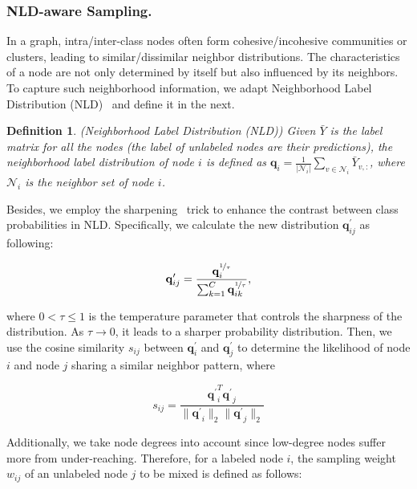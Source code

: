 \documentclass[letterpaper]{article} %
\newtheorem{definition}{Definition}
\newcommand{\aVec}[1]{\mathbf{#1}}
\begin{document}
\subsubsection{NLD-aware Sampling.}
In a graph, intra/inter-class nodes often form cohesive/incohesive communities or clusters, leading to similar/dissimilar neighbor distributions. The characteristics of a node are not only determined by itself but also influenced by its neighbors. To capture such neighborhood information, we adapt Neighborhood Label Distribution (NLD)~\cite{NLD} and define it in the next.
\begin{definition}{(Neighborhood Label Distribution (NLD))}
	 Given $\bar{Y}$ is the label matrix for all the nodes (the label of unlabeled nodes are their predictions), the neighborhood label distribution of node $i$ is defined as $\aVec{q}_{i} = \frac{1}{|\mathcal{N}_{i}|} \sum_{v \in \mathcal{N}_{i}} \bar{Y}_{v,:}$, where $\mathcal{N}_{i}$ is the neighbor set of node $i$.
\end{definition}
Besides, we employ the sharpening~\cite{sharp} trick to enhance the contrast between class probabilities in NLD. Specifically, we calculate the new distribution $\aVec{q}^{\prime}_{ij}$ as following:
\begin{small}
\begin{equation}
	\aVec{q}^{\prime}_{ij} = \frac{\aVec{q}^{\nicefrac{1}{\tau}}_{i}}{\sum_{k=1}^{C} \aVec{q}^{\nicefrac{1}{\tau}}_{ik}},
\end{equation}
\end{small}where $0 < \tau \leq 1 $ is the temperature parameter that controls the sharpness of the distribution. As $\tau \to 0$, it leads to a sharper probability distribution. Then, we use the cosine similarity $s_{ij}$ between $\aVec{q}_{i}^{\prime}$ and $\aVec{q}_{j}^{\prime}$ to determine the likelihood of node $i$ and node $j$ sharing a similar neighbor pattern, where
 \begin{small}
	\begin{equation}
	s_{ij} = \frac{\aVec{q^{\prime}}_{i}^{T}\aVec{q^{\prime}}_{j}}{\lVert \aVec{q^{\prime}}_{i} \rVert_{2} \lVert \aVec{q^{\prime}}_{j} \rVert_{2}}\end{equation}
\end{small}Additionally, we take node degrees into account since low-degree nodes suffer more from under-reaching. Therefore, for a labeled node $i$, the sampling weight $w_{ij}$ of an unlabeled node $j$ to be mixed is defined as follows:
\end{document}
